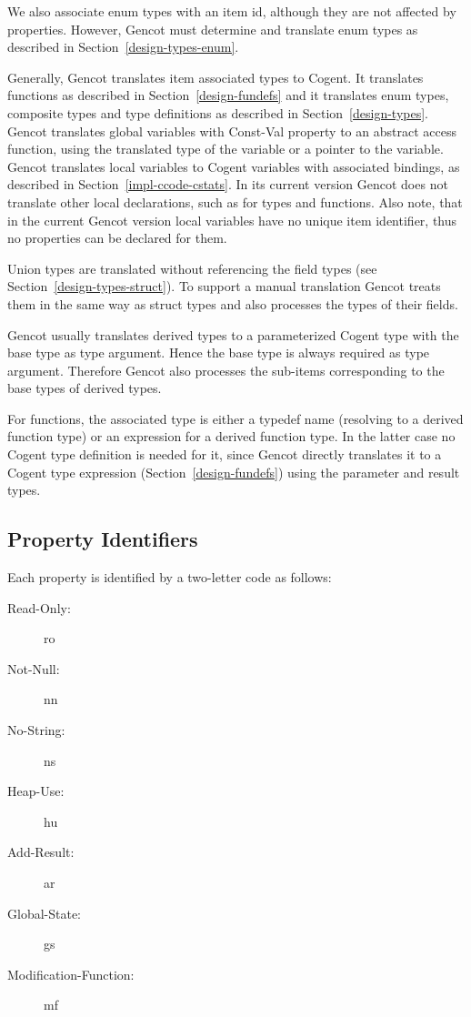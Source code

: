 We also associate enum types with an item id, although they are not affected by properties. However, Gencot must determine 
and translate enum types as described in Section~\ref{design-types-enum}.

Generally, Gencot translates item associated types to Cogent. It translates functions as described in Section~\ref{design-fundefs}
and it translates enum types, composite types and type definitions as described in Section~\ref{design-types}.
Gencot translates global variables with Const-Val property to an abstract access function, using the translated 
type of the variable or a pointer to the variable.
Gencot translates local variables to Cogent variables with associated bindings, as described in Section~\ref{impl-ccode-cstats}.
In its current version Gencot does not translate other local declarations, such as for types and functions.
Also note, that in the current Gencot version local variables have no unique item identifier, thus no properties
can be declared for them.

Union types are translated without referencing the field types
(see Section~\ref{design-types-struct}). To support a manual translation Gencot treats them in 
the same way as struct types and also processes the types of their fields.

Gencot usually translates derived types to a parameterized Cogent type with the base type as type argument. Hence the base
type is always required as type argument. Therefore Gencot also processes the sub-items corresponding to the base types 
of derived types.

For functions, the associated type is either a typedef name (resolving to a derived function type) 
or an expression for a derived function type. In the latter case no Cogent type definition is needed for it, since Gencot
directly translates it to a Cogent type expression (Section~\ref{design-fundefs}) using the parameter and result types. 

\subsection{Property Identifiers}
\label{impl-itemprops-property}

Each property is identified by a two-letter code as follows:
\begin{description}
\item[Read-Only:] ro
\item[Not-Null:] nn
\item[No-String:] ns
\item[Heap-Use:] hu
\item[Add-Result:] ar
\item[Global-State:] gs
\item[Modification-Function:] mf
\end{description}

